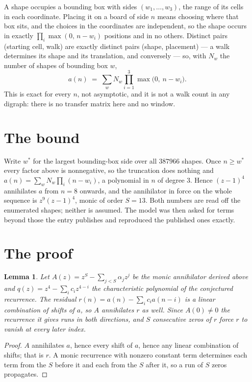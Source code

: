 \documentclass[11pt,a4paper]{article}
\theoremstyle{plain}
\newtheorem{lemma}[theorem]{Lemma}
\theoremstyle{definition}
\begin{document}
A shape occupies a bounding box with sides $(w_1,\dots,w_{3})$, the range of its cells in each
coordinate. Placing it on a board of side $n$ means choosing where that box sits, and the
choices in the coordinates are independent, so the shape occurs in exactly
$\prod_{i}\max(0,\,n-w_i)$ positions and in no others. Distinct pairs (starting cell,
walk) are exactly distinct pairs (shape, placement) --- a walk determines its shape and its
translation, and conversely --- so, with $N_w$ the number of shapes of bounding box $w$,
\[
a(n)\;=\;\sum_{w} N_w \prod_{i=1}^{3}\max\bigl(0,\ n-w_i\bigr).
\]
This is exact for every $n$, not asymptotic, and it is not a walk count in any digraph: there is
no transfer matrix here and no window.

\section{The bound}

Write $w^\ast$ for the largest bounding-box side over all $387966$ shapes. Once $n\ge w^\ast$
every factor above is nonnegative, so the truncation does nothing and
$a(n)=\sum_w N_w\prod_i(n-w_i)$, a polynomial in $n$ of degree $3$. Hence $(z-1)^{4}$
annihilates $a$ from $n=8$ onwards, and the annihilator in force on the whole sequence is
$z^{9}(z-1)^{4}$, monic of order $S=13$. Both numbers are read off the enumerated
shapes; neither is assumed. The model was then asked for terms beyond those the entry publishes
and reproduced the published ones exactly.

\section{The proof}

\begin{lemma}\label{lem:crit}
Let $A(z)=z^S-\sum_{j<S}\alpha_jz^{j}$ be the monic annihilator derived above and
$q(z)=z^{4}-\sum_ic_iz^{4-i}$ the characteristic polynomial of the conjectured
recurrence. The residual $r(n)=a(n)-\sum_ic_ia(n-i)$ is a linear combination of shifts of $a$,
so $A$ annihilates $r$ as well. Since $A(0)\ne0$ the recurrence it gives runs in both
directions, and $S$ consecutive zeros of $r$ force $r$ to vanish at every later index.
\end{lemma}

\begin{proof}
$A$ annihilates $a$, hence every shift of $a$, hence any linear combination of shifts; that is
$r$. A monic recurrence with nonzero constant term determines each term from the $S$ before it
and each from the $S$ after it, so a run of $S$ zeros propagates.
\end{proof}
\end{document}
